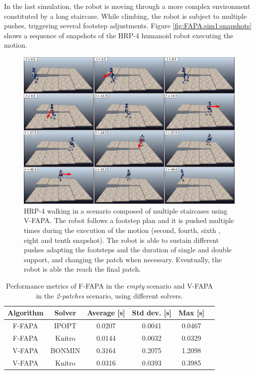In the last simulation, the robot is moving through a more complex environment
constituted by a long staircase. While climbing, the robot is subject to
multiple pushes, triggering several footstep adjustments.
Figure \ref{fig:FAPA:sim1:snapshots} shows a sequence of snapshots of the
HRP-4 humanoid robot executing the motion.
\begin{figure}
    \centering
    \includegraphics[width=\textwidth]{figures/staircase-multiple-pushes-snapshots.jpeg}
    \caption{HRP-4 walking in a scenario composed of multiple staircases
        using V-FAPA. The robot follows a footstep plan and it is pushed
        multiple times during the execution of the motion (second, fourth,
        sixth , eight and tenth snapshot). The robot is able to sustain
        different pushes adapting the footsteps and the duration of single
        and double support, and changing the patch when necessary.
        Eventually, the robot is able the reach the final patch.
    }
    \label{fig:FAPA:sim3:snapshots}
\end{figure}

\begin{table}
    \centering
    \begin{tabular}{*{6}{c}}
        Algorithm & Solver & Average [s] & Std dev. [s] & Max [s] \\
        \hline
        F-FAPA & IPOPT & 0.0207 & 0.0041 & 0.0467 \\
        F-FAPA & Knitro & 0.0144 & 0.0032 & 0.0329 \\
        V-FAPA & BONMIN & 0.3164 & 0.2075 & 1.2098 \\
        V-FAPA & Knitro & 0.0316 & 0.0393 & 0.3985
    \end{tabular}
    \caption{Performance metrics of F-FAPA in the {\em empty} scenario and
        V-FAPA in the {\em 2-patches} scenario, using different solvers.
    }
    \label{tab:benchmarks}
\end{table}

